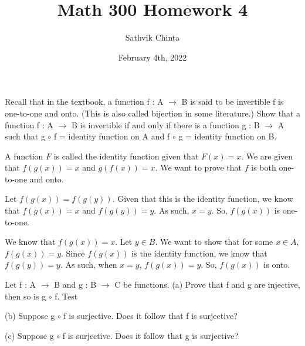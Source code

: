 \documentclass[addpoints]{exam}
\title{Math 300 Homework 4}
\author{Sathvik Chinta}
\date{February 4th, 2022}
\begin{document}
\maketitle

\begin{questions}
\question Recall that in the textbook, a function f : A $\rightarrow$ B is said to be
invertible f is one-to-one and onto. (This is also called bijection in some literature.)
Show that a function f : A $\rightarrow$ B is invertible if and only if there is a function g :
B $\rightarrow$ A such that g $\circ$ f = identity function on A and f $\circ$ g = identity 
function on B.

A function $F$ is called the identity function given that $F(x) = x$. We are given that $f(g(x)) 
= x$ and $g(f(x)) = x$. We want to prove that $f$ is both one-to-one and onto. 

Let $f(g(x)) = f(g(y))$. Given that this is the identity function, we know that $f(g(x)) = x$ 
and $f(g(y)) = y$. As such, $x = y$. So, $f(g(x))$ is one-to-one. 

We know that $f(g(x)) = x$. Let $y \in B$. We want to show that for some $x \in A$, $f(g(x)) = y$.
Since $f(g(x))$ is the identity function, we know that $f(g(y)) = y$. As such, when $x = y$, 
$f(g(x)) = y$. So, $f(g(x))$ is onto.

\question Let f : A $\rightarrow$ B and g : B $\rightarrow$ C be functions. 
(a) Prove that f and g are injective, then so is g $\circ$ f. Test

(b) Suppose g $\circ$ f is surjective. Does it follow that f is surjective?

(c) Suppose g $\circ$ f is surjective. Does it follow that g is surjective?

\end{questions}
\end{document}
